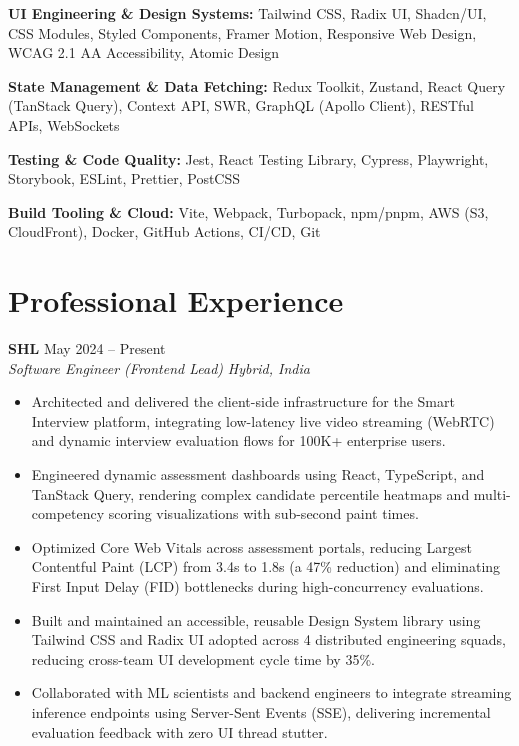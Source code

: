 \documentclass[10pt,a4paper]{article}
\newcommand{\jobheading}[4]{
  \textbf{#1} \hfill #2\\
  \textit{#3} \hfill \textit{#4}\\[-2pt]
}
\begin{document}
\textbf{UI Engineering \& Design Systems:}
Tailwind CSS, Radix UI, Shadcn/UI, CSS Modules, Styled Components, Framer Motion, Responsive Web Design, WCAG 2.1 AA Accessibility, Atomic Design

\textbf{State Management \& Data Fetching:}
Redux Toolkit, Zustand, React Query (TanStack Query), Context API, SWR, GraphQL (Apollo Client), RESTful APIs, WebSockets

\textbf{Testing \& Code Quality:}
Jest, React Testing Library, Cypress, Playwright, Storybook, ESLint, Prettier, PostCSS

\textbf{Build Tooling \& Cloud:}
Vite, Webpack, Turbopack, npm/pnpm, AWS (S3, CloudFront), Docker, GitHub Actions, CI/CD, Git


\section{Professional Experience}

\jobheading
  {SHL}
  {May 2024 -- Present}
  {Software Engineer (Frontend Lead)}
  {Hybrid, India}

\begin{itemize}
  \item Architected and delivered the client-side infrastructure for the Smart Interview platform, integrating low-latency live video streaming (WebRTC) and dynamic interview evaluation flows for 100K+ enterprise users.
  \item Engineered dynamic assessment dashboards using React, TypeScript, and TanStack Query, rendering complex candidate percentile heatmaps and multi-competency scoring visualizations with sub-second paint times.
  \item Optimized Core Web Vitals across assessment portals, reducing Largest Contentful Paint (LCP) from 3.4s to 1.8s (a 47\% reduction) and eliminating First Input Delay (FID) bottlenecks during high-concurrency evaluations.
  \item Built and maintained an accessible, reusable Design System library using Tailwind CSS and Radix UI adopted across 4 distributed engineering squads, reducing cross-team UI development cycle time by 35\%.
  \item Collaborated with ML scientists and backend engineers to integrate streaming inference endpoints using Server-Sent Events (SSE), delivering incremental evaluation feedback with zero UI thread stutter.
\end{itemize}
\end{document}
